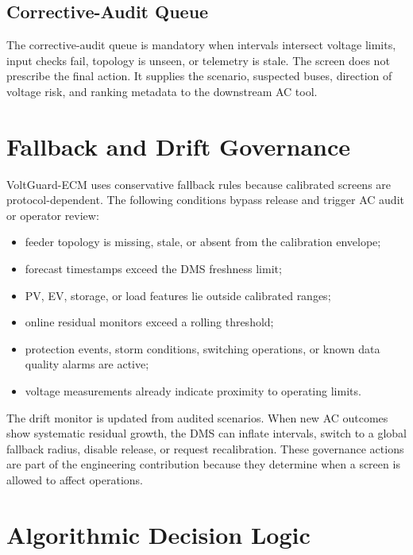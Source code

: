 \documentclass[
  preprint,12pt]{elsarticle}
\providecommand{\tightlist}{%
  \setlength{\itemsep}{0pt}\setlength{\parskip}{0pt}}
\begin{document}
\subsection{Corrective-Audit Queue}\label{corrective-audit-queue}

The corrective-audit queue is mandatory when intervals intersect voltage
limits, input checks fail, topology is unseen, or telemetry is stale.
The screen does not prescribe the final action. It supplies the
scenario, suspected buses, direction of voltage risk, and ranking
metadata to the downstream AC tool.

\section{Fallback and Drift
Governance}\label{fallback-and-drift-governance}

VoltGuard-ECM uses conservative fallback rules because calibrated
screens are protocol-dependent. The following conditions bypass release
and trigger AC audit or operator review:

\begin{itemize}
\tightlist
\item
  feeder topology is missing, stale, or absent from the calibration
  envelope;
\item
  forecast timestamps exceed the DMS freshness limit;
\item
  PV, EV, storage, or load features lie outside calibrated ranges;
\item
  online residual monitors exceed a rolling threshold;
\item
  protection events, storm conditions, switching operations, or known
  data quality alarms are active;
\item
  voltage measurements already indicate proximity to operating limits.
\end{itemize}

The drift monitor is updated from audited scenarios. When new AC
outcomes show systematic residual growth, the DMS can inflate intervals,
switch to a global fallback radius, disable release, or request
recalibration. These governance actions are part of the engineering
contribution because they determine when a screen is allowed to affect
operations.

\section{Algorithmic Decision Logic}\label{algorithmic-decision-logic}
\end{document}
